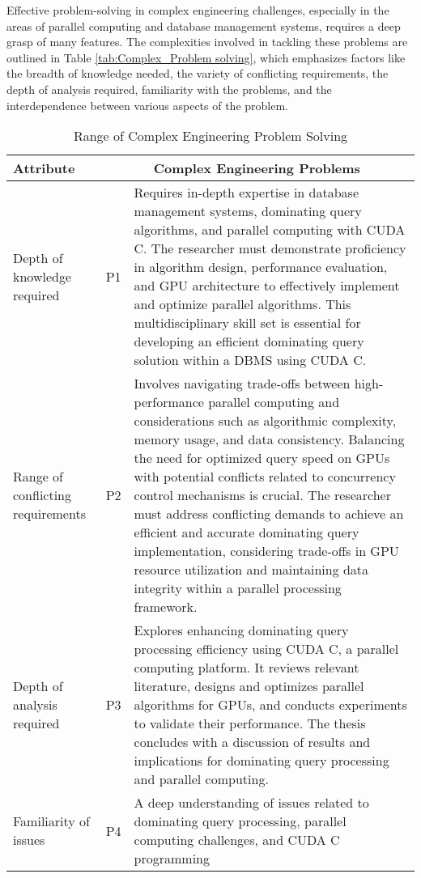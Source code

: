 
Effective problem-solving in complex engineering challenges, especially in the areas of parallel computing and database management systems, requires a deep grasp of many features. The complexities involved in tackling these problems are outlined in Table \ref{tab:Complex_Problem solving}, which emphasizes factors like the breadth of knowledge needed, the variety of conflicting requirements, the depth of analysis required, familiarity with the problems, and the interdependence between various aspects of the problem.

\begin{longtable}{|m{5cm}|m{1cm}|m{8cm}|}
\caption{Range of Complex Engineering Problem Solving}

\hline
Attribute & \multicolumn{2}{|c|}{Complex Engineering Problems }\\
\hline
Depth of knowledge required & P1 & Requires in-depth expertise in database management systems, dominating query algorithms, and parallel computing with CUDA C.
The researcher must demonstrate proficiency in algorithm design,
performance evaluation, and GPU architecture to effectively implement and optimize parallel algorithms. This multidisciplinary skill
set is essential for developing an efficient dominating query solution within a DBMS using CUDA C. \\
\hline
Range of conflicting requirements & P2 & Involves navigating trade-offs between high-performance parallel computing and considerations such as algorithmic complexity,
memory usage, and data consistency. Balancing the need for optimized query speed on GPUs with potential conflicts related to
concurrency control mechanisms is crucial. The researcher must
address conflicting demands to achieve an efficient and accurate
dominating query implementation, considering trade-offs in GPU
resource utilization and maintaining data integrity within a parallel
processing framework.\\
\hline
Depth of analysis required & P3 & Explores enhancing dominating query processing efficiency using CUDA C, a parallel computing platform. It reviews relevant literature, designs and optimizes parallel algorithms for GPUs, and conducts experiments to validate their performance. The thesis concludes with a discussion of results and implications for dominating query processing and parallel computing. \\
\hline
Familiarity of issues & P4 & A deep understanding of issues related to dominating query processing, parallel computing challenges, and CUDA C programming

\end{longtable}
